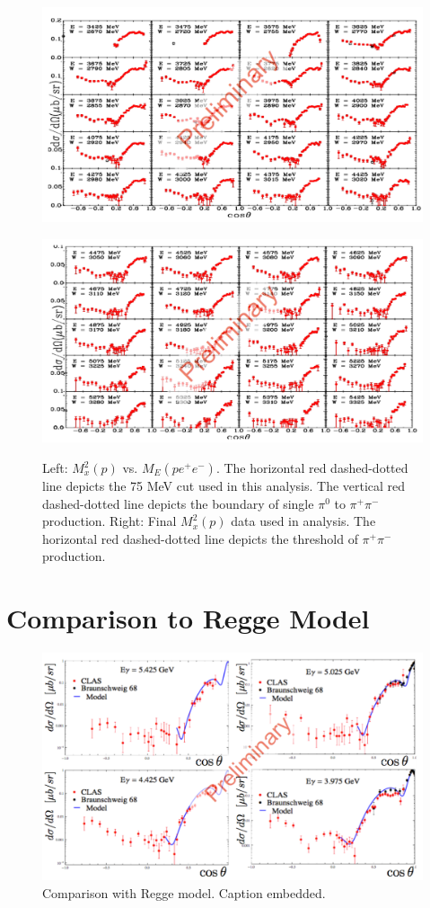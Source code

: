 \documentclass{aip-cp}
\begin{document}
\begin{figure}[h!]
	\centering
	\begin{minipage}{.50\textwidth}
		\centering
		\includegraphics[width=225 pt, height = 160 pt]{figures/pi0_xsectionIII.pdf}
		\caption{}{}
		\label{fig:pi0III}
	\end{minipage}%
	\centering
	\begin{minipage}{.50\textwidth}
		\centering
		\includegraphics[width=225 pt, height = 155 pt]{figures/pi0_xsectionIV.pdf}
		\caption{Left: $M_x^2 (p)$ vs. $M_E(pe^+e^-)$. The horizontal red dashed-dotted line depicts the 75 MeV cut used in this analysis. The vertical red dashed-dotted line depicts the boundary of single $\pi^0$ to $\pi^{+}\pi^{-}$ production. Right: Final $M_x^2(p)$ data used in analysis. The horizontal red dashed-dotted line depicts the threshold of $\pi^{+}\pi^{-}$ production.}{}
		\label{fig:pi0IV}
	\end{minipage}
\end{figure}
\section{Comparison to Regge Model}
\begin{figure}[h]
	\centerline{\includegraphics[width=225 pt]{figures/pi0_regge.pdf}}
	\caption{Comparison with Regge model. Caption embedded. }
	\label{fig:pi0_regge}
\end{figure}
\end{document}
